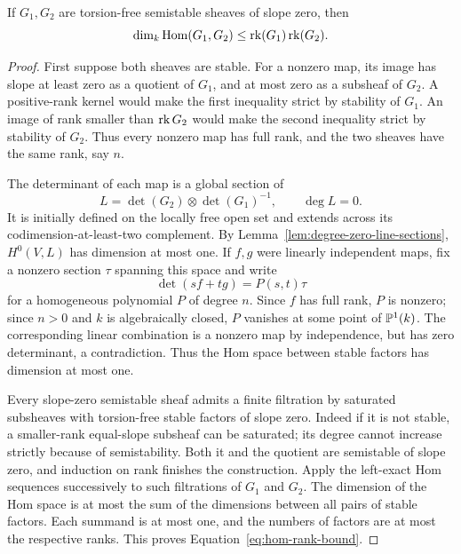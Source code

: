 \begin{lemma}
\label{lem:semistable-hom-bound}
If $G_1,G_2$ are torsion-free semistable sheaves of slope zero, then
\begin{equation}
  \dim_k\operatorname{Hom}(G_1,G_2)\le\operatorname{rk}(G_1)\operatorname{rk}(G_2).
  \label{eq:hom-rank-bound}
\end{equation}
\end{lemma}

\begin{proof}
First suppose both sheaves are stable.  For a nonzero map, its image has
slope at least zero as a quotient of $G_1$, and at most zero as a
subsheaf of $G_2$.  A positive-rank kernel would make the first inequality
strict by stability of $G_1$.  An image of rank smaller than $\operatorname{rk} G_2$
would make the second inequality strict by stability of $G_2$.  Thus
every nonzero map has full rank, and the two sheaves have the same rank,
say $n$.

The determinant of each map is a global section of
\[
  L=\det(G_2)\otimes\det(G_1)^{-1},\qquad\deg L=0.
\]
It is initially defined on the locally free open set and extends across
its codimension-at-least-two complement.  By
Lemma~\ref{lem:degree-zero-line-sections}, $H^0(V,L)$ has dimension at
most one.  If $f,g$ were linearly independent maps, fix a nonzero section
$\tau$ spanning this space and write
\[
  \det(sf+tg)=P(s,t)\tau
\]
for a homogeneous polynomial $P$ of degree $n$.  Since $f$ has full rank,
$P$ is nonzero; since $n>0$ and $k$ is algebraically closed, $P$ vanishes
at some point of $\mathbb P^1(k)$.  The corresponding linear combination is a
nonzero map by independence, but has zero determinant, a contradiction.
Thus the Hom space between stable factors has dimension at most one.

Every slope-zero semistable sheaf admits a finite filtration by saturated
subsheaves with torsion-free stable factors of slope zero.  Indeed if it
is not stable, a smaller-rank equal-slope subsheaf can be saturated; its
degree cannot increase strictly because of semistability.  Both it and
the quotient are semistable of slope zero, and induction on rank finishes
the construction.  Apply the left-exact Hom sequences successively to
such filtrations of $G_1$ and $G_2$.  The dimension of the Hom space is at
most the sum of the dimensions between all pairs of stable factors.
Each summand is at most one, and the numbers of factors are at most the
respective ranks.  This proves Equation~\eqref{eq:hom-rank-bound}.
\end{proof}

